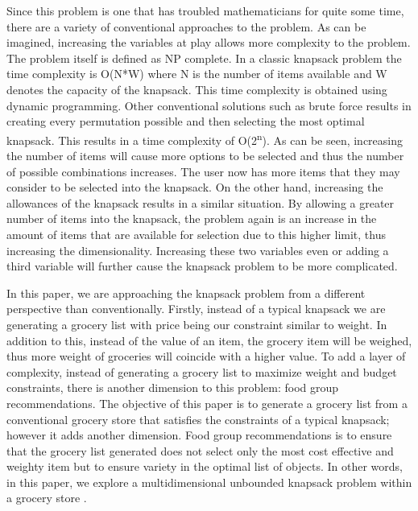 \documentclass[10pt,journal,compsoc]{IEEEtran}
\begin{document}
Since this problem is one that has troubled mathematicians for quite some time,
there are a variety of conventional approaches to the problem. As can be
imagined, increasing the variables at play allows more complexity to the
problem. The problem itself is defined as NP complete. In a classic knapsack
problem the time complexity is O(N*W) where N is the number of items available
and W denotes the capacity of the knapsack. This time complexity is obtained
using dynamic programming. Other conventional solutions such as brute force
results in creating every permutation possible and then selecting the most
optimal knapsack. This results in a time complexity of O(2\textsuperscript{n}).
As can be seen, increasing the number of items will cause more options to be
selected and thus the number of possible combinations increases. The user now
has more items that they may consider to be selected into the knapsack. On the
other hand, increasing the allowances of the knapsack results in a similar
situation. By allowing a greater number of items into the knapsack, the problem
again is an increase in the amount of items that are available for selection due
to this higher limit, thus increasing the dimensionality. Increasing these two
variables even or adding a third variable will further cause the knapsack
problem to be more complicated.


In this paper, we are approaching the knapsack problem from a different
perspective than conventionally. Firstly, instead of a typical knapsack we are
generating a grocery list with price being our constraint similar to weight. In
addition to this, instead of the value of an item, the grocery item will be
weighed, thus more weight of groceries will coincide with a higher value. To add
a layer of complexity, instead of generating a grocery list to maximize weight
and budget constraints, there is another dimension to this problem: food group
recommendations. The objective of this paper is to generate a grocery list from
a conventional grocery store that satisfies the constraints of a typical
knapsack; however it adds another dimension. Food group recommendations is to
ensure that the grocery list generated does not select only the most cost
effective and weighty item but to ensure variety in the optimal list of objects.
In other words, in this paper, we explore a multidimensional unbounded knapsack
problem within a grocery store \cite{agha_binary_2021}.

\end{document}
